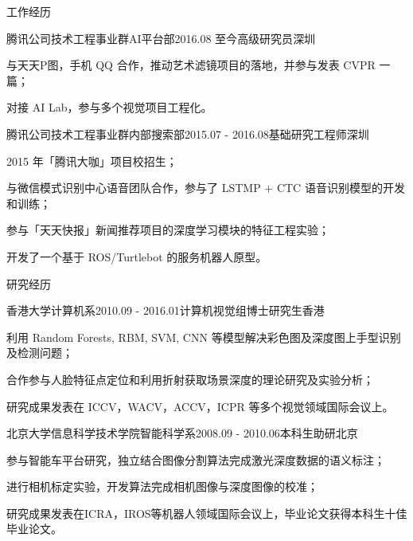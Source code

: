 \documentclass[UTF8]{cv_professional-cn} %
\begin{document}
\begin{rSection}{工作经历}

  \begin{rSubsection}{腾讯公司技术工程事业群AI平台部}{2016.08 至今}{高级研究员}{深圳}
    \item 与天天P图，手机 QQ 合作，推动艺术滤镜项目的落地，并参与发表 CVPR 一篇；
    \item 对接 AI Lab，参与多个视觉项目工程化。
  \end{rSubsection}

	\begin{rSubsection}{腾讯公司技术工程事业群内部搜索部}{2015.07 - 2016.08}{基础研究工程师}{深圳}
		\item 2015 年「腾讯大咖」项目校招生；
		\item 与微信模式识别中心语音团队合作，参与了 LSTMP + CTC 语音识别模型的开发和训练；
		\item 参与「天天快报」新闻推荐项目的深度学习模块的特征工程实验；
		\item 开发了一个基于 ROS/Turtlebot 的服务机器人原型。
	\end{rSubsection}

\end{rSection}



\begin{rSection}{研究经历}

\begin{rSubsection}{香港大学计算机系}{2010.09 - 2016.01}{计算机视觉组博士研究生}{香港}
	\item 利用 Random Forests, RBM, SVM, CNN 等模型解决彩色图及深度图上手型识别及检测问题；
	\item 合作参与人脸特征点定位和利用折射获取场景深度的理论研究及实验分析；
	\item 研究成果发表在 ICCV，WACV，ACCV，ICPR 等多个视觉领域国际会议上。
\end{rSubsection}

\begin{rSubsection}{北京大学信息科学技术学院智能科学系}{2008.09 - 2010.06}{本科生助研}{北京}
    \item 参与智能车平台研究，独立结合图像分割算法完成激光深度数据的语义标注；
    \item 进行相机标定实验，开发算法完成相机图像与深度图像的校准；
    \item 研究成果发表在ICRA，IROS等机器人领域国际会议上，毕业论文获得本科生十佳毕业论文。
\end{rSubsection}

\end{rSection}
\end{document}
